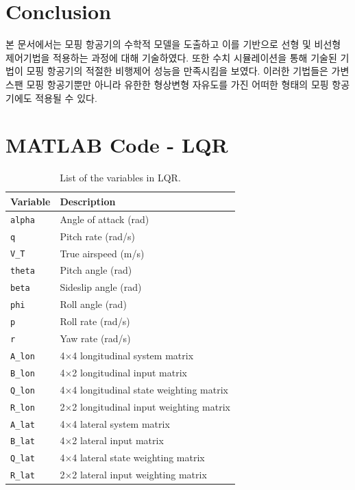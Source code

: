 \documentclass[a4paper, 12pt]{report}
\begin{document}
	\chapter{Conclusion}
	
	본 문서에서는 모핑 항공기의 수학적 모델을 도출하고 이를 기반으로 선형 및 비선형 제어기법을 적용하는 과정에 대해 기술하였다.
	또한 수치 시뮬레이션을 통해 기술된 기법이 모핑 항공기의 적절한 비행제어 성능을 만족시킴을 보였다.
	이러한 기법들은 가변스팬 모핑 항공기뿐만 아니라 유한한 형상변형 자유도를 가진 어떠한 형태의 모핑 항공기에도 적용될 수 있다.
	
	\printbibliography
	
	\appendix
	
	\chapter{MATLAB Code - LQR}
	
	\begin{table}[h]
		\centering
		\begin{tabular}{ll}
			\toprule
			\textbf{Variable} & \textbf{Description} \\
			\midrule
			\verb+alpha+ & Angle of attack (rad)\\
			\verb+q+ & Pitch rate (rad/s) \\
			\verb+V_T+ & True airspeed (m/s) \\
			\verb+theta+ & Pitch angle (rad) \\
			\verb+beta+ & Sideslip angle (rad) \\
			\verb+phi+ & Roll angle (rad) \\
			\verb+p+ & Roll rate (rad/s) \\
			\verb+r+ & Yaw rate (rad/s) \\
			\verb+A_lon+ & 4$\times$4 longitudinal system matrix \\
			\verb+B_lon+ & 4$\times$2 longitudinal input matrix \\
			\verb+Q_lon+ & 4$\times$4 longitudinal state weighting matrix \\
			\verb+R_lon+ & 2$\times$2 longitudinal input weighting matrix \\
			\verb+A_lat+ & 4$\times$4 lateral system matrix \\
			\verb+B_lat+ & 4$\times$2 lateral input matrix \\
			\verb+Q_lat+ & 4$\times$4 lateral state weighting matrix \\
			\verb+R_lat+ & 2$\times$2 lateral input weighting matrix \\
			\bottomrule
		\end{tabular}
		\caption{List of the variables in LQR.}
		\label{tab:lqr_variables}
	\end{table}
	
\end{document}
